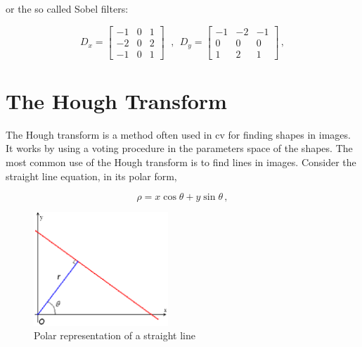 or the so called Sobel filters:

\begin{equation*}
  D_x = \begin{bmatrix}
    -1 & 0 & 1 \\
    -2 & 0 & 2 \\
    -1 & 0 & 1
  \end{bmatrix} \ \ \,,  \ \
  D_y = \begin{bmatrix}
    -1 & -2 & -1 \\
    0  & 0  & 0  \\
    1  & 2  & 1
  \end{bmatrix}\,,
\end{equation*}

\section{The Hough Transform}\label{sec:hough}
The Hough transform is a method often used in \acrshort{cv} for finding shapes in images. It works by using a voting procedure in the parameters space of the shapes. The most common use of the Hough transform is to find lines in images.
Consider the straight line equation, in its polar form,

\begin{equation*}
  \rho = x \cos{\theta} + y \sin{\theta} \,,
\end{equation*}

\begin{figure}[htbp]
  \centering
  \includegraphics[width=0.45\textwidth]{gfx/R_theta_line.eps}
  \caption{Polar representation of a straight line \cite{pichough}}
  \label{fig:linePolar}
\end{figure}

